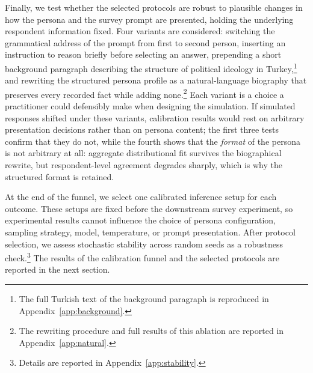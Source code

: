 Finally, we test whether the selected protocols are robust to plausible
changes in how the persona and the survey prompt are presented, holding the
underlying respondent information fixed. Four variants are considered:
switching the grammatical address of the prompt from first to second
person, inserting an instruction to reason briefly before selecting an
answer, prepending a short background paragraph describing the structure of
political ideology in Turkey,\footnote{The full Turkish text of the
background paragraph is reproduced in Appendix~\ref{app:background}.} and
rewriting the structured persona profile as a natural-language biography
that preserves every recorded fact while adding none.\footnote{The
rewriting procedure and full results of this ablation are reported in
Appendix~\ref{app:natural}.} Each variant is a choice a practitioner could
defensibly make when designing the simulation. If simulated responses
shifted under these variants, calibration results would rest on arbitrary
presentation decisions rather than on persona content; the first three
tests confirm that they do not, while the fourth shows that the
\emph{format} of the persona is not arbitrary at all: aggregate
distributional fit survives the biographical rewrite, but respondent-level
agreement degrades sharply, which is why the structured format is retained.

At the end of the funnel, we select one calibrated inference setup for each
outcome. These setups are fixed before the downstream survey experiment, so
experimental results cannot influence the choice of persona configuration,
sampling strategy, model, temperature, or prompt presentation. After
protocol selection, we assess stochastic stability across random seeds as a
robustness check.\footnote{Details are reported in
Appendix~\ref{app:stability}.} The results of the calibration funnel and
the selected protocols are reported in the next section.

